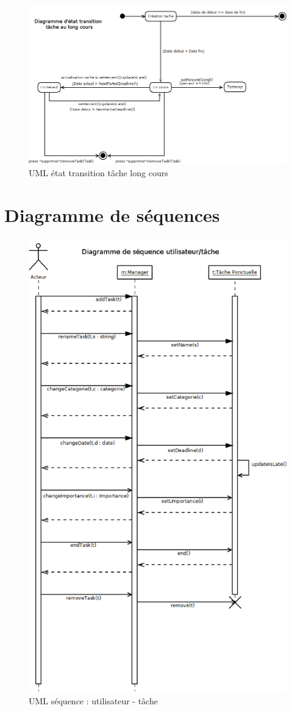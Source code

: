 \documentclass{article}
\makeatletter
\def\bigcentering{\let\\\@centercr\rightskip\@bigflushglue%
\leftskip\@bigflushglue
\parindent\z@\parfillskip\z@skip}
\makeatother
\begin{document}
\begin{figure}[!h]
	\bigcentering	
	\includegraphics[scale=0.34]{UML/tache_long_cours.png}
	\caption{UML état transition tâche long cours}
	\label{UML état transition tâche long cours}
\end{figure}

\section{Diagramme de séquences}

\begin{figure}[!h]
	\centering	
	\includegraphics[scale=0.4]{UML/diagramme_de_sequence.png}
	\caption{UML séquence : utilisateur - tâche}
	\label{UML séquence : utilisateur - tâche}
\end{figure}
\end{document}
